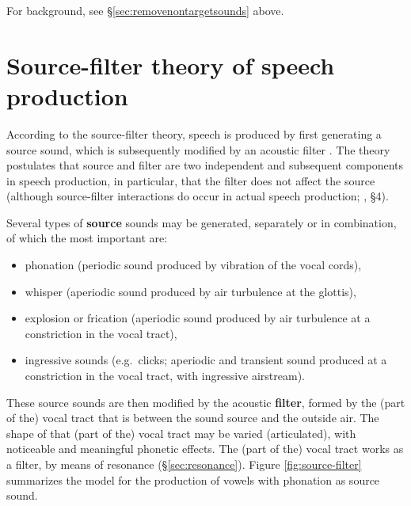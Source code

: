 \documentclass[
]{book}
\begin{document}
For background, see §\ref{sec:removenontargetsounds} above.

\section{Source-filter theory of speech production}\label{sec:sourcefilter}

According to the source-filter theory, speech is produced by first generating a source sound, which is subsequently modified by an acoustic filter \citep{Fant_1970}. The theory postulates that source and filter are two independent and subsequent components in speech production, in particular, that the filter does not affect the source (although source-filter interactions do occur in actual speech production; \citet{Tokuda_2021}, §4).

Several types of \textbf{source} sounds may be generated, separately or in combination, of which the most important are:

\begin{itemize}
\item
  phonation (periodic sound produced by vibration of the vocal cords),
\item
  whisper (aperiodic sound produced by air turbulence at the glottis),
\item
  explosion or frication (aperiodic sound produced by air turbulence at a constriction in the vocal tract),
\item
  ingressive sounds (e.g.~clicks; aperiodic and transient sound produced at a constriction in the vocal tract, with ingressive airstream).
\end{itemize}

These source sounds are then modified by the acoustic \textbf{filter}, formed by the (part of the) vocal tract that is between the sound source and the outside air. The shape of that (part of the) vocal tract may be varied (articulated), with noticeable and meaningful phonetic effects. The (part of the) vocal tract works as a filter, by means of resonance (§\ref{sec:resonance}). Figure \ref{fig:source-filter} summarizes the model for the production of vowels with phonation as source sound.
\end{document}
